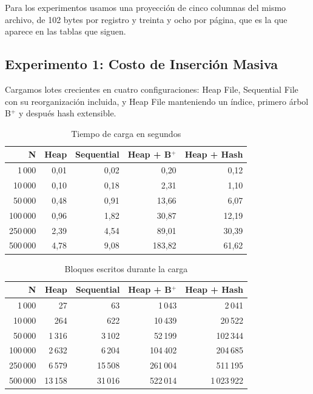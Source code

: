 \documentclass[a4paper,12pt]{article}
\begin{document}
Para los experimentos usamos una proyección de cinco columnas del mismo archivo,
de 102 bytes por registro y treinta y ocho por página, que es la que aparece en
las tablas que siguen.

\subsection{Experimento 1: Costo de Inserción Masiva}

Cargamos lotes crecientes en cuatro configuraciones: Heap File, Sequential File
con su reorganización incluida, y Heap File manteniendo un índice, primero
árbol B$^+$ y después hash extensible.

\begin{table}[H]
\centering
\caption{Tiempo de carga en segundos}
\begin{tabular}{@{}rrrrr@{}}
\toprule
\textbf{N} & \textbf{Heap} & \textbf{Sequential} & \textbf{Heap + B$^+$} & \textbf{Heap + Hash} \\
\midrule
1\,000 & 0{,}01 & 0{,}02 & 0{,}20 & 0{,}12 \\
10\,000 & 0{,}10 & 0{,}18 & 2{,}31 & 1{,}10 \\
50\,000 & 0{,}48 & 0{,}91 & 13{,}66 & 6{,}07 \\
100\,000 & 0{,}96 & 1{,}82 & 30{,}87 & 12{,}19 \\
250\,000 & 2{,}39 & 4{,}54 & 89{,}01 & 30{,}39 \\
500\,000 & 4{,}78 & 9{,}08 & 183{,}82 & 61{,}62 \\
\bottomrule
\end{tabular}
\end{table}

\begin{table}[H]
\centering
\caption{Bloques escritos durante la carga}
\begin{tabular}{@{}rrrrr@{}}
\toprule
\textbf{N} & \textbf{Heap} & \textbf{Sequential} & \textbf{Heap + B$^+$} & \textbf{Heap + Hash} \\
\midrule
1\,000 & 27 & 63 & 1\,043 & 2\,041 \\
10\,000 & 264 & 622 & 10\,439 & 20\,522 \\
50\,000 & 1\,316 & 3\,102 & 52\,199 & 102\,344 \\
100\,000 & 2\,632 & 6\,204 & 104\,402 & 204\,685 \\
250\,000 & 6\,579 & 15\,508 & 261\,004 & 511\,195 \\
500\,000 & 13\,158 & 31\,016 & 522\,014 & 1\,023\,922 \\
\bottomrule
\end{tabular}
\end{table}
\end{document}
